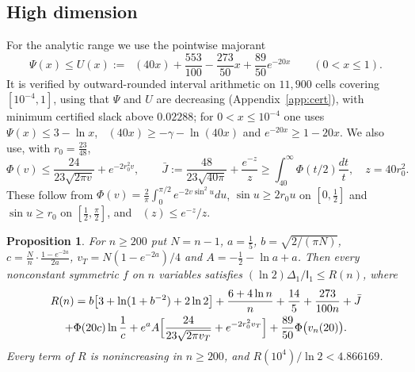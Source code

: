 \documentclass[11pt]{amsart}
\newtheorem{proposition}[theorem]{Proposition}
\theoremstyle{definition}
\theoremstyle{remark}
\newcommand{\I}{\mathsf I}
\DeclareMathOperator{\Ei}{E_1}
\begin{document}
\subsection{High dimension}
For the analytic range we use the pointwise majorant
\begin{equation}\label{eq:majorant}
 \Psi(x)\le U(x):=\Ei(40x)+\frac{553}{100}-\frac{273}{50}x+\frac{89}{50}e^{-20x}\qquad(0<x\le1).
\end{equation}
It is verified by outward-rounded interval arithmetic on $11{,}900$ cells covering $[10^{-4},1]$, using that $\Psi$ and $U$ are decreasing (Appendix~\ref{app:cert}), with minimum certified slack above $0.02288$; for $0<x\le10^{-4}$ one uses $\Psi(x)\le3-\ln x$, $\Ei(40x)\ge-\gamma-\ln(40x)$ and $e^{-20x}\ge1-20x$. We also use, with $r_0=\frac{23}{48}$,
\begin{equation}\label{eq:Phibound}
 \Phi(v)\le\frac{24}{23\sqrt{2\pi v}}+e^{-2r_0^2v},\qquad
 \bar J:=\frac{48}{23\sqrt{40\pi}}+\frac{e^{-z}}z\ge\int_{40}^\infty\Phi(t/2)\frac{dt}t,\quad z=40r_0^2.
\end{equation}
These follow from $\Phi(v)=\frac2\pi\int_0^{\pi/2}e^{-2v\sin^2u}du$, $\sin u\ge2r_0u$ on $[0,\frac12]$ and $\sin u\ge r_0$ on $[\frac12,\frac\pi2]$, and $\Ei(z)\le e^{-z}/z$.

\begin{proposition}\label{prop:large}
For $n\ge200$ put $N=n-1$, $a=\frac15$, $b=\sqrt{2/(\pi N)}$, $c=\frac Nn\cdot\frac{1-e^{-2a}}{2a}$, $v_T=N(1-e^{-2a})/4$ and $A=-\frac12-\ln a+a$. Then every nonconstant symmetric $f$ on $n$ variables satisfies $(\ln2)\Delta_1/\I_1\le R(n)$, where
\begin{multline*}
 R(n)=b\bigl[3+\ln(1+b^{-2})+2\ln2\bigr]+\frac{6+4\ln n}{n}+\frac{14}5+\frac{273}{100n}+\bar J\\
 +\Phi(20c)\ln\frac1c+e^aA\Bigl[\frac{24}{23\sqrt{2\pi v_T}}+e^{-2r_0^2v_T}\Bigr]+\frac{89}{50}\Phi\bigl(v_n(20)\bigr).
\end{multline*}
Every term of $R$ is nonincreasing in $n\ge200$, and $R(10^4)/\ln2<4.866169$.
\end{proposition}
\end{document}
